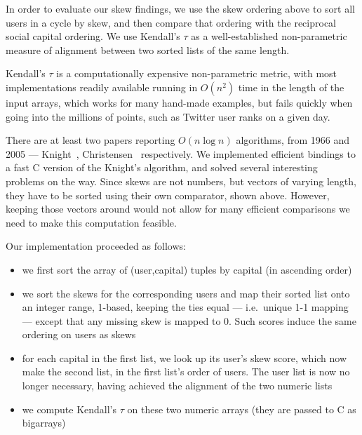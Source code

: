 \documentclass[10pt,oneside]{memoir}
\begin{document}
\begin{Spacing}{2}
\begin{lstlisting}
\end{lstlisting}
\label{listing:compare-skew}
In order to evaluate our skew findings, we use the skew ordering above to sort all users in a cycle by skew, and then compare that ordering with the reciprocal social capital ordering.  We use Kendall's $\tau$ as a well-established non-parametric measure of alignment between two sorted lists of the same length.


Kendall's $\tau$ is a computationally expensive non-parametric metric, with most implementations readily available running in $O(n^2)$ time in the length of the input arrays, which works for many hand-made examples, but fails quickly when going into the millions of points, such as Twitter user ranks on a given day.


There are at least two papers reporting $O(n \log n)$ algorithms, from 1966 and 2005 --- Knight~\cite{knight1966computer}, Christensen~\cite{christensen2005fast-kendall} respectively.  We implemented efficient bindings to a fast C version of the Knight's algorithm, and solved several interesting problems on the way.  Since skews are not numbers, but vectors of varying length, they have to be sorted using their own comparator, shown above.  However, keeping those vectors around would not allow for many efficient comparisons we need to make this computation feasible.


Our implementation proceeded as follows:


\begin{itemize}


\item we first sort the array of (user,capital) tuples by capital (in ascending order)

\item we sort the skews for the corresponding users and map their sorted list onto an integer range, 1-based, keeping the ties equal --- i.e.\ unique 1-1 mapping --- except that any missing skew is mapped to 0.  Such scores induce the same ordering on users as skews

\item for each capital in the first list, we look up its user's skew score, which now make the second list, in the first list's order of users.  The user list is now no longer necessary, having achieved the alignment of the two numeric lists

\item we compute Kendall's $\tau$ on these two numeric arrays (they are passed to C as bigarrays)
\end{itemize}


\end{Spacing}
\end{document}
